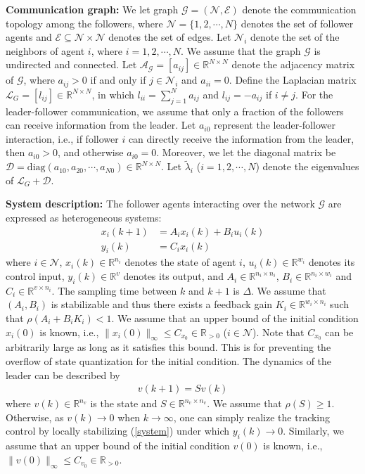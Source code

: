 \documentclass{autart}
\begin{document}
\textbf{Communication graph:}
We let graph $\mathcal{G} = (\mathcal{N},\mathcal{E})$ denote the communication topology among the followers, where $\mathcal{N}=\{1, 2, \cdots, N \}$ denotes the set of follower agents and $\mathcal{E} \subseteq \mathcal{N} \times \mathcal{N}$ denotes the set of edges. Let $\mathcal N_i$ denote the set of the neighbors of agent $i$, where $i=1, 2, \cdots, N$. We assume that the graph $\mathcal{G}$ is undirected and connected. Let $\mathcal A _ {\mathcal G}= [a_{ij}] \in \mathbb{R}^{N\times N} $ denote the adjacency matrix of $\mathcal {G}$, where $a_{ij} > 0$ if and only if $j \in \mathcal N_i$ and $a_{ii}=0$. Define the Laplacian matrix $\mathcal L_ G = [l_{ij}]  \in \mathbb{R}^{N\times N} $, in which $l_{ii} = \sum_{j = 1 }^{N} a_{ij}$ and $l_{ij} = - a_{ij} $ if $i \ne j $. For the leader-follower communication, we assume that only a fraction of the followers can receive information from the leader. Let $a_{i0}$ represent the leader-follower interaction, i.e., if follower $i$ can directly receive the information from the leader, then $a_{i0}>0$, and otherwise $a_{i0}=0$. Moreover, we let the diagonal matrix be $ \mathcal D= \text{diag}(a_{10}, a_{20}, \cdots, a_{N0}) \in \mathbb{R}^{N \times N}$. Let $\tilde \lambda_i$ ($i=1, 2, \cdots, N$) denote the eigenvalues of $\mathcal L_ G + \mathcal D $. 




\textbf{System description:} The follower agents interacting over the network $\mathcal{G}$ are expressed as heterogeneous systems:
\begin{subequations}\label{system}
	\begin{align}
	x_i(k+1) &= A_i x_i(k) +B_i u_i(k) \\
	y_i(k)&= C_i x_i(k)
	\end{align}
\end{subequations}
where $i \in \mathcal N$, $x_i(k)\in \mathbb{R}^{n_i }$ denotes the state of agent $i$, $u_i(k) \in \mathbb{R}^{w_i}$ denotes its control input, $y_i(k)\in \mathbb{R}^{v}$ denotes its output, and $A_i \in \mathbb R^{n_i \times n_i}$, $B_i \in \mathbb R^{n_i \times w_i}$ and $C_i\in \mathbb R^{v\times n_i}$. The sampling time between $k$ and $k+1$ is $\Delta$.
We assume that $(A_i,B_i)$ is stabilizable and thus there exists a feedback gain $K_i \in \mathbb R ^{w_i \times n_i}$ such that $\rho(A_i+B_i K_i)<1$. We assume that an upper bound of the initial condition $x_i(0)$ is known, i.e., $\| x_i(0)\|_\infty \le C_{x_0} \in \mathbb{R}_{>0}$ ($i \in \mathcal N$). 
Note that $C_{x_0}$ can be arbitrarily large as long as it satisfies this bound. This is for preventing the overflow of state quantization for the initial condition.
The dynamics of the leader can be described by
\begin{align}\label{leader}
v(k+1) = S v(k)
\end{align}
where $v(k) \in \mathbb R ^{n_v}$ is the state and $S \in \mathbb R^{n_v\times n_v}$. We assume that $\rho(S) \ge 1$. Otherwise, as $v(k) \to 0$ when $k\to \infty$, one can simply realize the tracking control by locally stabilizing (\ref{system}) under which $y_i(k)\to 0$. Similarly, we assume that an upper bound of the initial condition $v(0)$ is known, i.e., $\| v(0)\|_\infty \le C_{v_0} \in \mathbb{R}_{>0}$. 
\end{document}
